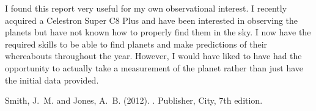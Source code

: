 \documentclass{article}
\begin{document}
I found this report very useful for my own observational interest. I recently acquired a Celestron Super C8 Plus and have
been interested in observing the planets but have not known how to properly find them in the sky. I now have the 
required skills to be able to find planets and make predictions of their whereabouts throughout the year. However, I would
have liked to have had the opportunity to actually take a measurement of the planet rather than just have the initial
data provided.


\begin{thebibliography}{9}

Smith, J.~M. and Jones, A.~B. (2012).
.
\newblock Publisher, City, 7th edition.

\end{thebibliography}
\end{document}
